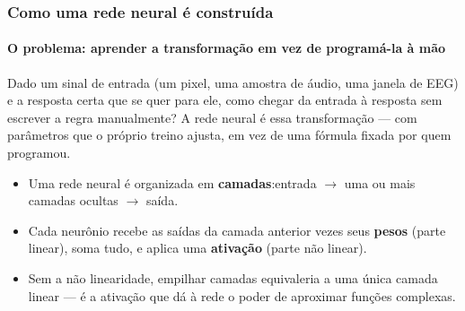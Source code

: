 \begin{frame}[shrink]
	\frametitle{Como uma rede neural é construída}
	\framesubtitle{O problema: aprender a transformação em vez de programá-la à mão}
	\small
	\par Dado um sinal de entrada (um pixel, uma amostra de áudio, uma janela de EEG) e a resposta certa que se quer para ele, como chegar da entrada à resposta sem escrever a regra manualmente? A rede neural é essa transformação --- com parâmetros que o próprio treino ajusta, em vez de uma fórmula fixada por quem programou.
	\begin{itemize}
		\item Uma rede neural é organizada em \textbf{camadas}:\newline entrada $\rightarrow$ uma ou mais camadas ocultas $\rightarrow$ saída.\newline
		
		\item Cada neurônio recebe as saídas da camada anterior vezes seus \textbf{pesos} (parte linear), soma tudo, e aplica uma \textbf{ativação} (parte não linear).\newline
		
		
		\item Sem a não linearidade, empilhar camadas equivaleria a uma única camada linear --- é a ativação que dá à rede o poder de aproximar funções complexas.
	\end{itemize}
	\vspace{1pt}
	\begin{center}
	\end{center}
\end{frame}

